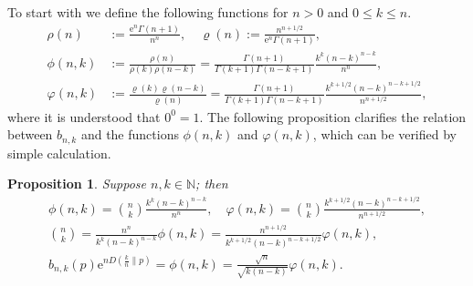 \documentclass[aop]{imsart}
\theoremstyle{plain}
\newtheorem{proposition}[theorem]{Proposition}
\theoremstyle{remark}
\newcommand{\rme}{\mathrm{e}}
\newcommand{\bbN}{\mathbb{N}}
\newcommand{\1}{\operatorname{\uppercase\expandafter{\romannumeral1}}}
\newcommand{\2}{\operatorname{\uppercase\expandafter{\romannumeral2}}}
\newcommand{\3}{\operatorname{\uppercase\expandafter{\romannumeral3}}}
\newcommand{\4}{\operatorname{\uppercase\expandafter{\romannumeral4}}}
\newcommand{\5}{\operatorname{\uppercase\expandafter{\romannumeral5}}}
\newcommand{\6}{\operatorname{\uppercase\expandafter{\romannumeral6}}}
\newcommand{\7}{\operatorname{\uppercase\expandafter{\romannumeral7}}}
\newcommand{\8}{\operatorname{\uppercase\expandafter{\romannumeral8}}}
\newcommand{\9}{\operatorname{\uppercase\expandafter{\romannumeral9}}}
\begin{document}
To start with we define the following functions for $n>0$ and $0\leq k\leq n$. 
\begin{align}
\rho(n)&:=\frac{\rme^n\Gamma(n+1)}{n^n},\quad 
\varrho(n):=\frac{n^{n+1/2}}{\rme^n\Gamma(n+1)},\label{eq:rhovarrho} \\
\phi(n,k)&:=\frac{\rho(n)}{\rho(k)\rho(n-k)}=\frac{\Gamma(n+1)}{\Gamma(k+1)\Gamma(n-k+1)}\frac{k^{k}(n-k)^{n-k}}{n^{n}}, \label{eq:phi(nk)}\\
\varphi(n,k)&:=\frac{\varrho(k)\varrho(n-k)}{\varrho(n)}=\frac{\Gamma(n+1)}{\Gamma(k+1)\Gamma(n-k+1)}\frac{k^{k+1/2}(n-k)^{n-k+1/2}}{n^{n+1/2}},\label{eq:varphi(nk)}
\end{align}
where it is understood that $0^0=1$. 
The following proposition clarifies the relation between $b_{n,k}$ and the functions $\phi(n,k)$ and $\varphi(n,k)$, which can be verified by simple calculation.
\begin{proposition}\label{pro:bnkpphi}
Suppose $n,k\in \bbN$; then  
\begin{gather}
\phi(n,k) =\binom{n}{k}\frac{k^{k}(n-k)^{n-k}}{n^{n}},\quad 
\varphi(n,k)=\binom{n}{k}\frac{k^{k+1/2}(n-k)^{n-k+1/2}}{n^{n+1/2}}, \label{eq:binomphi}\\[1ex]
\binom{n}{k}=\frac{n^{n}}{k^{k}(n-k)^{n-k}}\phi(n,k)
=\frac{n^{n+1/2}}{k^{k+1/2}(n-k)^{n-k+1/2}}\varphi(n,k),\\[1ex]
b_{n,k}(p)\rme^{nD(\frac{k}{n}\| p)}=\phi(n,k)=\frac{\sqrt{n}}{\sqrt{ k(n-k)}} \varphi(n,k). \label{eq:bnkphi}
\end{gather}
\end{proposition}
\end{document}
